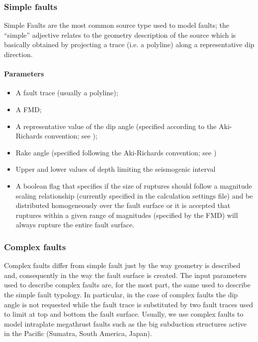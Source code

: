 \subsubsection{Simple faults}
%
Simple Faults are the most common source type used to model faults; the 
``simple'' adjective relates to the geometry description of the source 
which is basically obtained by projecting a trace (i.e. a polyline) along 
a representative dip direction. 
%
\paragraph{Parameters}
%
\begin{itemize}
\item A fault trace (usually a polyline); 
\item A FMD;
\item A representative value of the dip angle (specified according to 
the Aki-Richards convention; see \citet{aki2002});
\item Rake angle (specified following the Aki-Richards convention; 
see \citet{aki2002}) 
\item Upper and lower values of depth limiting the seismogenic interval 
\item A boolean flag that specifies if the size of ruptures should 
follow a magnitude scaling relationship (currently specified in the 
calculation settings file) and be distributed homogeneously over the 
fault surface or it is accepted that ruptures within a given range of 
magnitudes (specified by the FMD) will always rupture the entire fault 
surface.
\end{itemize}
%
\subsubsection{Complex faults}
%
Complex faults  differ from simple fault just by the way geometry is 
described and, consequently in the way the fault surface is created. The 
input parameters used to describe complex faults are, for the most part, 
the same used to describe the simple fault typology. In particular, in 
the case of complex faults the dip angle is not requested while the fault
trace is substituted by two fault traces used to limit at top and bottom 
the fault surface. 
%
Usually, we use complex faults to model intraplate megathrust faults such 
as the big subduction structures active in the Pacific (Sumatra, South 
America, Japan).
